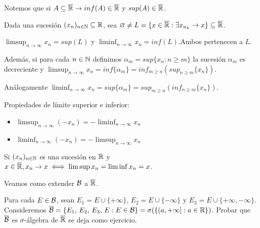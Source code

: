 Notemos que si $A \subseteq \overline{\mathbb{R}} \to inf(A) \in \overline{\mathbb{R}}$ y $sup(A) \in \overline{\mathbb{R}}$.

Dada una sucesión $(x_n)_{n \in \mathbb{N}} \subseteq \mathbb{R}$, sea $\varnothing \neq L = \{ x \in \overline{\mathbb{R}} : \exists x_{n_k} \to x \} \subseteq \overline{\mathbb{R}}$.

\begin{definition}
    $\limsup_{n \to \infty} x_n = sup(L)$ y $\liminf_{n \to \infty} x_n = inf(L)$.Ambos pertenecen a $L$.

    Además, si para cada $n \in \mathbb{N}$ definimos $\alpha_m = sup\{ x_n : n \geq m \}$ la sucesión $\alpha_m$ es decreciente y
    $\limsup_{n \to \infty} x_n = inf\{\alpha_m\} = inf_{m \geq n} ( sup_{n \geq m}\{x_n\} )$.

    Análogamente $\liminf_{n \to \infty} x_n = sup\{\alpha_m\} = sup_{m \geq n} ( inf_{n \geq m}\{x_n\} )$.
\end{definition}

\begin{prop}
    Propiedades de límite superior e inferior:
    \begin{itemize}
        \item $\limsup_{n \to \infty} (- x_n) = - \liminf_{n \to \infty} x_n$
        \item $\liminf_{n \to \infty} (- x_n) = - \limsup_{n \to \infty} x_n$
    \end{itemize}
\end{prop}

\begin{note}
    Si $(x_n)_{n \in \mathbb{N}}$ es una sucesión en $\mathbb{R}$ y $x \in \overline{\mathbb{R}}, x_n \to x \iff \limsup x_n = \liminf x_n = x$.
\end{note}

Veamos como extender $\mathcal{B}$ a $\overline{\mathbb{R}}$.

\begin{definition}
    Para cada $E \in \mathcal{B}$, sean $E_1 = E \cup \{ + \infty \}$, $E_2 = E \cup \{ - \infty \}$ y $E_3 = E \cup \{ + \infty, - \infty \}$.
    Consideremos $\overline{\mathcal{B}} = \{ E_1 \text{, } E_2 \text{, } E_3 \text{, } E : E \in \mathcal{B} \} = \sigma(\{ (a, +\infty] : a \in \mathbb{R} \})$.
    Probar que $\overline{\mathcal{B}}$ es $\sigma$-álgebra de $\overline{\mathbb{R}}$ se deja como ejercicio.
\end{definition}


